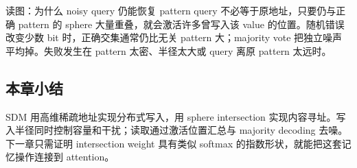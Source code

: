 
\begin{knowledgebox}{读图：为什么 noisy query 仍能恢复 pattern}
query 不必等于原地址，只要仍与正确 pattern 的 sphere 大量重叠，就会激活许多曾写入该 value 的位置。随机错误改变少数 bit 时，正确交集通常仍比无关 pattern 大；majority vote 把独立噪声平均掉。失败发生在 pattern 太密、半径太大或 query 离原 pattern 太远时。
\end{knowledgebox}

\subsection{本章小结}

SDM 用高维稀疏地址实现分布式写入，用 sphere intersection 实现内容寻址。写入半径同时控制容量和干扰；读取通过激活位置汇总与 majority decoding 去噪。下一章只需证明 intersection weight 具有类似 softmax 的指数形状，就能把这套记忆操作连接到 attention。

